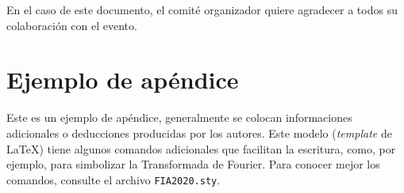 \documentclass[12pt, a4paper, twoside, twocolumn]{article}
\begin{document}
En el caso de este documento, el comité organizador quiere agradecer a todos su colaboración con el evento.
\renewcommand{\refname}{Referencias} 
%  
{{\fontrefs }
\appendix
\section{Ejemplo de apéndice}

Este es un ejemplo de apéndice, generalmente se colocan informaciones adicionales o deducciones producidas por los autores.
Este modelo (\textit{template} de \LaTeX) tiene algunos comandos adicionales que facilitan la escritura, como, por ejemplo,  \F\xspace para simbolizar la Transformada de Fourier. Para conocer mejor los comandos, consulte el archivo  \texttt{FIA2020.sty}.

}
%
%

\end{document}
